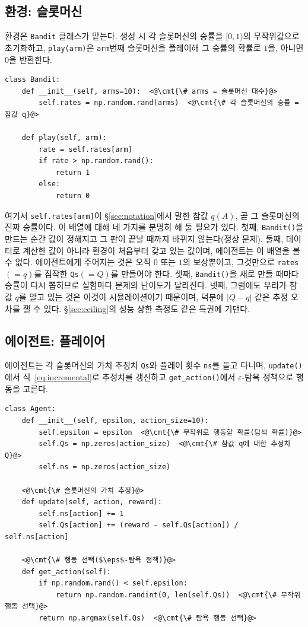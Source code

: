 \documentclass[11pt,a4paper]{article}
\newcommand{\qt}{q}                       %
\newcommand{\Qe}{Q}                       %
\newcommand{\eps}{\varepsilon}
\newcommand{\cmt}[1]{\textcolor{codecm}{#1}}   %
\begin{document}
\subsection{환경: 슬롯머신}

환경은 \texttt{Bandit} 클래스가 맡는다. 생성 시 각 슬롯머신의 승률을 $[0,1)$의 무작위값으로
초기화하고, \texttt{play(arm)}은 \texttt{arm}번째 슬롯머신을 플레이해 그 승률의 확률로 $1$을,
아니면 $0$을 반환한다.

\begin{lstlisting}[caption={환경 구현 (\texttt{s02\_bandit.py})},label={lst:bandit}]
class Bandit:
    def __init__(self, arms=10):  <@\cmt{\# arms = 슬롯머신 대수}@>
        self.rates = np.random.rand(arms)  <@\cmt{\# 각 슬롯머신의 승률 = 참값 q}@>

    def play(self, arm):
        rate = self.rates[arm]
        if rate > np.random.rand():
            return 1
        else:
            return 0
\end{lstlisting}

여기서 \texttt{self.rates[arm]}이 \S\ref{sec:notation}에서 말한 참값 $\qt(A)$, 곧 그 슬롯머신의 진짜
승률이다. 이 배열에 대해 네 가지를 분명히 해 둘 필요가 있다.
첫째, \texttt{Bandit()}을 만드는 순간 값이 정해지고 그 판이 끝날 때까지 바뀌지 않는다(정상 문제).
둘째, 데이터로 계산한 값이 아니라 환경이 처음부터 갖고 있는 값이며, 에이전트는 이 배열을 볼 수 없다.
에이전트에게 주어지는 것은 오직 $0$ 또는 $1$의 보상뿐이고, 그것만으로 \texttt{rates}$(=\qt)$를 짐작한
\texttt{Qs}$(=\Qe)$를 만들어야 한다.
셋째, \texttt{Bandit()}을 새로 만들 때마다 승률이 다시 뽑히므로 실험마다 문제의 난이도가 달라진다.
넷째, 그럼에도 우리가 참값 $\qt$를 알고 있는 것은 이것이 시뮬레이션이기 때문이며, 덕분에
$|\Qe-\qt|$ 같은 추정 오차를 잴 수 있다. \S\ref{sec:ceiling}의 성능 상한 측정도 같은 특권에 기댄다.

\subsection{에이전트: 플레이어}

에이전트는 각 슬롯머신의 가치 추정치 \texttt{Qs}와 플레이 횟수 \texttt{ns}를 들고 다니며,
\texttt{update()}에서 식~\eqref{eq:incremental}로 추정치를 갱신하고 \texttt{get\_action()}에서
$\eps$-탐욕 정책으로 행동을 고른다.

\begin{lstlisting}[caption={에이전트 구현 (\texttt{s02\_bandit.py})},label={lst:agent}]
class Agent:
    def __init__(self, epsilon, action_size=10):
        self.epsilon = epsilon  <@\cmt{\# 무작위로 행동할 확률(탐색 확률)}@>
        self.Qs = np.zeros(action_size)  <@\cmt{\# 참값 q에 대한 추정치 Q}@>
        self.ns = np.zeros(action_size)

    <@\cmt{\# 슬롯머신의 가치 추정}@>
    def update(self, action, reward):
        self.ns[action] += 1
        self.Qs[action] += (reward - self.Qs[action]) / self.ns[action]

    <@\cmt{\# 행동 선택($\eps$-탐욕 정책)}@>
    def get_action(self):
        if np.random.rand() < self.epsilon:
            return np.random.randint(0, len(self.Qs))  <@\cmt{\# 무작위 행동 선택}@>
        return np.argmax(self.Qs)  <@\cmt{\# 탐욕 행동 선택}@>
\end{lstlisting}
\end{document}
